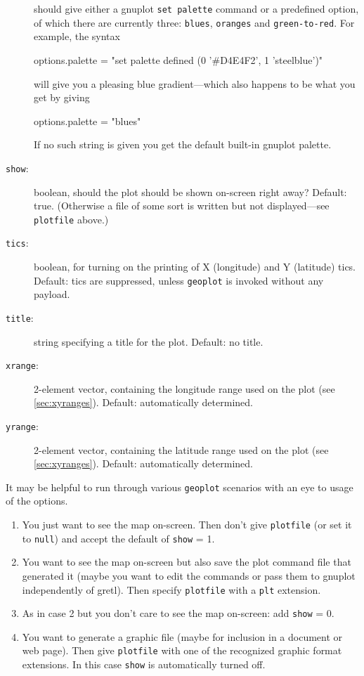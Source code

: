 \documentclass{article}
\begin{document}
\begin{description}
  should give either a \textsf{gnuplot} \texttt{set palette} command
  or a predefined option, of which there are currently three:
  \texttt{blues}, \texttt{oranges} and \texttt{green-to-red}. For
  example, the syntax
  \begin{code}
    options.palette = "set palette defined (0 '#D4E4F2', 1 'steelblue')"
  \end{code}
  will give you a pleasing blue gradient---which also happens to be
  what you get by giving
  \begin{code}
    options.palette = "blues"
  \end{code}
  If no such string is given you get the default built-in
  \textsf{gnuplot} palette.
\item[\texttt{show}:] boolean, should the plot should be shown
  on-screen right away? Default: true. (Otherwise a file of some sort
  is written but not displayed---see \texttt{plotfile} above.)
\item[\texttt{tics}:] boolean, for turning on the printing of X
  (longitude) and Y (latitude) tics. Default: tics are suppressed,
  unless \texttt{geoplot} is invoked without any payload.
\item[\texttt{title}:] string specifying a title for the
  plot. Default: no title.
\item[\texttt{xrange}:] 2-element vector, containing the longitude
  range used on the plot (see \ref{sec:xyranges}). Default:
  automatically determined.
\item[\texttt{yrange}:] 2-element vector, containing the latitude
  range used on the plot (see \ref{sec:xyranges}). Default:
  automatically determined.
\end{description}

It may be helpful to run through various \texttt{geoplot} scenarios
with an eye to usage of the options.

\begin{enumerate}
\item You just want to see the map on-screen. Then don't give
  \texttt{plotfile} (or set it to \texttt{null}) and accept the
  default of \texttt{show} = 1.\label{just-see}
\item You want to see the map on-screen but also save the plot command
  file that generated it (maybe you want to edit the commands or pass
  them to \textsf{gnuplot} independently of gretl). Then specify
  \texttt{plotfile} with a \texttt{plt} extension.\label{see-and-save}
\item As in case 2 but you don't care to see the map on-screen: add
  \texttt{show} = 0.
\item You want to generate a graphic file (maybe for inclusion in a
  document or web page). Then give \texttt{plotfile} with one of the
  recognized graphic format extensions. In this case \texttt{show} is
  automatically turned off.
\end{enumerate}
\end{document}
